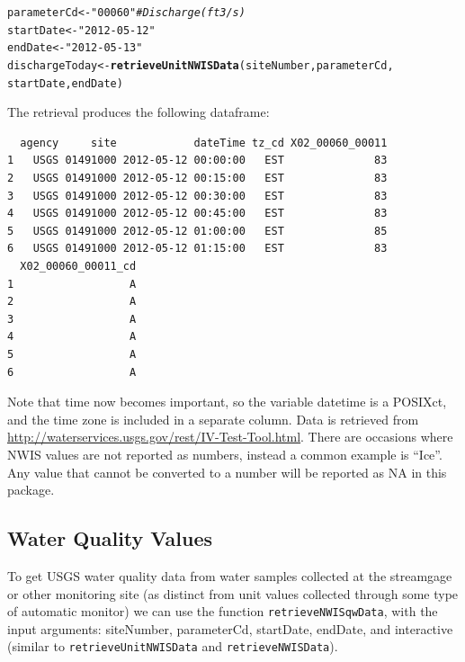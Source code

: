 \documentclass[a4paper,11pt]{article}\usepackage[]{graphicx}\usepackage[]{color}
\makeatletter
\newcommand{\hlstr}[1]{\textcolor[rgb]{0.192,0.494,0.8}{#1}}%
\newcommand{\hlcom}[1]{\textcolor[rgb]{0.678,0.584,0.686}{\textit{#1}}}%
\newcommand{\hlstd}[1]{\textcolor[rgb]{0.345,0.345,0.345}{#1}}%
\newcommand{\hlkwb}[1]{\textcolor[rgb]{0.69,0.353,0.396}{#1}}%
\newcommand{\hlkwd}[1]{\textcolor[rgb]{0.737,0.353,0.396}{\textbf{#1}}}%
\newenvironment{kframe}{%
 \def\at@end@of@kframe{}%
 \ifinner\ifhmode%
  \def\at@end@of@kframe{\end{minipage}}%
  \begin{minipage}{\columnwidth}%
 \fi\fi%
 \def\FrameCommand##1{\hskip\@totalleftmargin \hskip-\fboxsep
 \colorbox{shadecolor}{##1}\hskip-\fboxsep
     \hskip-\linewidth \hskip-\@totalleftmargin \hskip\columnwidth}%
 \MakeFramed {\advance\hsize-\width
   \@totalleftmargin\z@ \linewidth\hsize
   \@setminipage}}%
 {\par\unskip\endMakeFramed%
 \at@end@of@kframe}
\newenvironment{knitrout}{}{} %
\makeatother
\begin{document}
\begin{knitrout}
\color{fgcolor}\begin{kframe}
\begin{alltt}
\hlstd{parameterCd} \hlkwb{<-} \hlstr{"00060"}  \hlcom{# Discharge (ft3/s)}
\hlstd{startDate} \hlkwb{<-} \hlstr{"2012-05-12"}
\hlstd{endDate} \hlkwb{<-} \hlstr{"2012-05-13"}
\hlstd{dischargeToday} \hlkwb{<-} \hlkwd{retrieveUnitNWISData}\hlstd{(siteNumber, parameterCd,}
        \hlstd{startDate, endDate)}
\end{alltt}
\end{kframe}
\end{knitrout}

The retrieval produces the following dataframe:

\begin{knitrout}
\color{fgcolor}\begin{kframe}
\begin{verbatim}
  agency     site            dateTime tz_cd X02_00060_00011
1   USGS 01491000 2012-05-12 00:00:00   EST              83
2   USGS 01491000 2012-05-12 00:15:00   EST              83
3   USGS 01491000 2012-05-12 00:30:00   EST              83
4   USGS 01491000 2012-05-12 00:45:00   EST              83
5   USGS 01491000 2012-05-12 01:00:00   EST              85
6   USGS 01491000 2012-05-12 01:15:00   EST              83
  X02_00060_00011_cd
1                  A
2                  A
3                  A
4                  A
5                  A
6                  A
\end{verbatim}
\end{kframe}
\end{knitrout}

Note that time now becomes important, so the variable datetime is a POSIXct, and the time zone is included in a separate column. Data is retrieved from \url{http://waterservices.usgs.gov/rest/IV-Test-Tool.html}. There are occasions where NWIS values are not reported as numbers, instead a common example is \enquote{Ice}.  Any value that cannot be converted to a number will be reported as NA in this package.

\newpage


\FloatBarrier

\subsection{Water Quality Values}
\label{sec:usgsWQP}
To get USGS water quality data from water samples collected at the streamgage or other monitoring site (as distinct from unit values collected through some type of automatic monitor) we can use the function \texttt{retrieveNWISqwData}, with the input arguments: siteNumber, parameterCd, startDate, endDate, and interactive (similar to \texttt{retrieveUnitNWISData} and \texttt{retrieveNWISData}).
\end{document}
